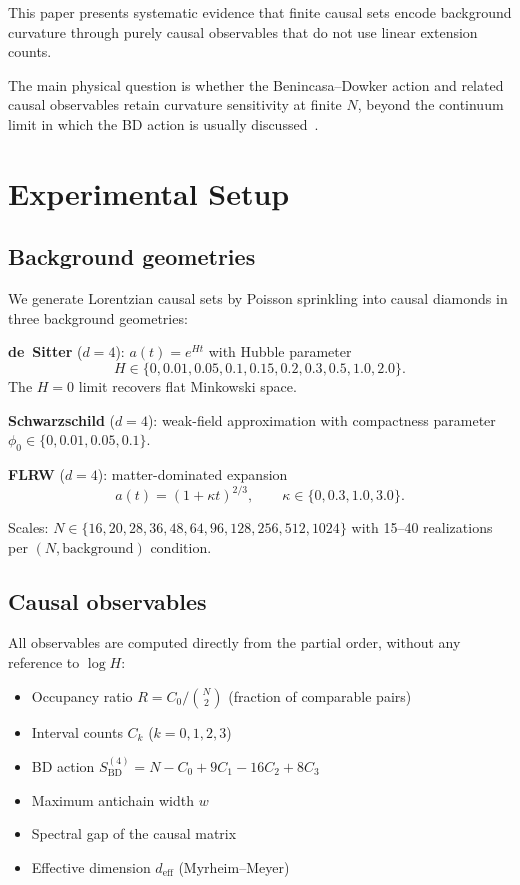 \documentclass[12pt,a4paper]{article}
\newcommand{\SBD}{S_{\mathrm{BD}}}
\begin{document}
This paper presents systematic evidence that finite causal sets encode
background curvature through purely causal observables that do not use linear
extension counts.

The main physical question is whether the Benincasa--Dowker action and related
causal observables retain curvature sensitivity at finite $N$, beyond the
continuum limit in which the BD action is usually discussed~\cite{BenincasaDowker2010,Surya2019}.

\section{Experimental Setup}

\subsection{Background geometries}

We generate Lorentzian causal sets by Poisson sprinkling into causal diamonds
in three background geometries:

\textbf{de~Sitter} ($d=4$): $a(t) = e^{Ht}$ with Hubble parameter
\[
H\in\{0, 0.01, 0.05, 0.1, 0.15, 0.2, 0.3, 0.5, 1.0, 2.0\}.
\]
The $H=0$ limit recovers flat Minkowski space.

\textbf{Schwarzschild} ($d=4$): weak-field approximation with compactness
parameter $\phi_0\in\{0, 0.01, 0.05, 0.1\}$.

\textbf{FLRW} ($d=4$): matter-dominated expansion
\[
a(t)=(1+\kappa t)^{2/3}, \qquad \kappa\in\{0, 0.3, 1.0, 3.0\}.
\]

Scales: $N\in\{16, 20, 28, 36, 48, 64, 96, 128, 256, 512, 1024\}$ with
15--40 realizations per $(N, \text{background})$ condition.

\subsection{Causal observables}

All observables are computed directly from the partial order, without any
reference to $\log H$:
\begin{itemize}
\item Occupancy ratio $R = C_0/\binom{N}{2}$ (fraction of comparable pairs)
\item Interval counts $C_k$ ($k=0,1,2,3$)
\item BD action $\SBD^{(4)} = N - C_0 + 9C_1 - 16C_2 + 8C_3$
\item Maximum antichain width $w$
\item Spectral gap of the causal matrix
\item Effective dimension $d_{\mathrm{eff}}$ (Myrheim--Meyer)
\end{itemize}
\end{document}
